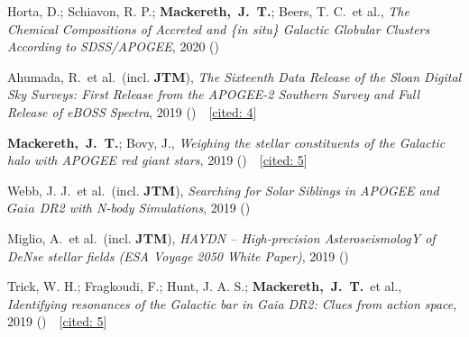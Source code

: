 \item[{\scriptsize6}]Horta, D.; Schiavon, R. P.; \textbf{Mackereth,~J.~T.}; Beers, T. C.~et al., \textit{The Chemical Compositions of Accreted and {\{}\it in situ{\}} Galactic Globular Clusters According to SDSS/APOGEE}, 2020 ()

\item[{\scriptsize5}]Ahumada, R.~et al.~(incl. \textbf{JTM}), \textit{The Sixteenth Data Release of the Sloan Digital Sky Surveys: First Release from the APOGEE-2 Southern Survey and Full Release of eBOSS Spectra}, 2019 ()~~{\footnotesize[\href{http://adsabs.harvard.edu/abs/2019arXiv191202905A}{cited: 4}]}

\item[{\scriptsize4}]\textbf{Mackereth,~J.~T.}; Bovy, J., \textit{Weighing the stellar constituents of the Galactic halo with APOGEE red giant stars}, 2019 ()~~{\footnotesize[\href{http://adsabs.harvard.edu/abs/2019arXiv191003590M}{cited: 5}]}

\item[{\scriptsize3}]Webb, J. J.~et al.~(incl. \textbf{JTM}), \textit{Searching for Solar Siblings in APOGEE and $Gaia$ DR2 with N-body Simulations}, 2019 ()

\item[{\scriptsize2}]Miglio, A.~et al.~(incl. \textbf{JTM}), \textit{HAYDN -- High-precision AsteroseismologY of DeNse stellar fields (ESA Voyage 2050 White Paper)}, 2019 ()

\item[{\scriptsize1}]Trick, W. H.; Fragkoudi, F.; Hunt, J. A. S.; \textbf{Mackereth,~J.~T.}~et al., \textit{Identifying resonances of the Galactic bar in Gaia DR2: Clues from action space}, 2019 ()~~{\footnotesize[\href{http://adsabs.harvard.edu/abs/2019arXiv190604786T}{cited: 5}]}